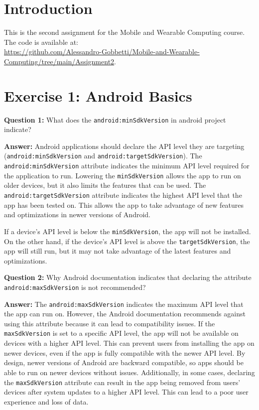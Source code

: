 \documentclass{usireport}
\begin{document}
\maketitlepage

\section{Introduction}
This is the second assignment for the Mobile and Wearable Computing course. The code is available at: \\\url{https://github.com/Alessandro-Gobbetti/Mobile-and-Wearable-Computing/tree/main/Assignment2}.

\section{Exercise 1: Android Basics}

\textbf{Question 1:} What does the \texttt{android:minSdkVersion} in android project indicate?

\textbf{Answer:} Android applications should declare the API level they are targeting (\texttt{android:minSdkVersion} and \texttt{android:targetSdkVersion}). 
The \texttt{android:minSdkVersion} attribute indicates the minimum API level required for the application to run. Lowering the \texttt{minSdkVersion} allows the app to run on older devices, but it also limits the features that can be used. 
The \texttt{android:targetSdkVersion} attribute indicates the highest API level that the app has been tested on. This allows the app to take advantage of new features and optimizations in newer versions of Android.

If a device's API level is below the \texttt{minSdkVersion}, the app will not be installed. On the other hand, if the device's API level is above the \texttt{targetSdkVersion}, the app will still run, but it may not take advantage of the latest features and optimizations.

\textbf{Question 2:} Why Android documentation indicates that declaring the attribute \texttt{android:maxSdkVersion} is not recommended?

\textbf{Answer:} The \texttt{android:maxSdkVersion} indicates the maximum API level that the app can run on. However, the Android documentation recommends against using this attribute because it can lead to compatibility issues. If the \texttt{maxSdkVersion} is set to a specific API level, the app will not be available on devices with a higher API level. This can prevent users from installing the app on newer devices, even if the app is fully compatible with the newer API level. By design, newer versions of Android are backward compatible, so apps should be able to run on newer devices without issues.
Additionally, in some cases, declaring the \texttt{maxSdkVersion} attribute can result in the app being removed from users' devices after system updates to a higher API level. This can lead to a poor user experience and loss of data.
\end{document}

